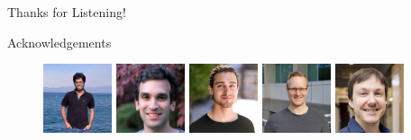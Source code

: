 \documentclass[mathserif,notheorems, hyperref={colorlinks, citecolor=blue, urlcolor=blue, linkcolor=blue}]{beamer}
\begin{document}


    \begin{frame}{}
        \begin{center}
        \huge Thanks for Listening!
        \end{center}
    \end{frame}



    \begin{frame}{Acknowledgements}
     
        \begin{figure}
            \centering
            \includegraphics[width=0.18\textwidth]{collaborators/sharan}
            \includegraphics[width=0.18\textwidth]{collaborators/issam}
            \includegraphics[width=0.18\textwidth]{collaborators/gauthier}
            \includegraphics[width=0.18\textwidth]{collaborators/mark}
            \includegraphics[width=0.18\textwidth]{collaborators/simon}


\end{figure}
\end{frame}
\end{document}
